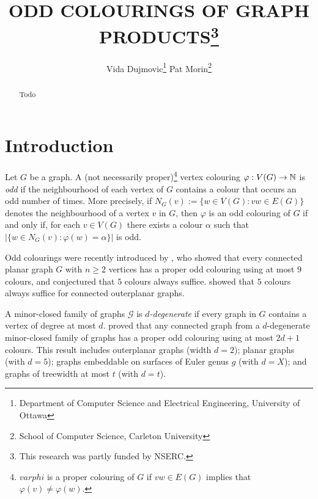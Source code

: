 \documentclass{patmorin}
\title{\MakeUppercase{Odd Colourings of Graph Products}\thanks{This research was partly funded by NSERC.}}
\author{%
  Vida Dujmovic\thanks{Department of Computer Science and Electrical Engineering, University of Ottawa}\qquad
  Pat Morin\thanks{School of Computer Science, Carleton University}
}
\date{}
\begin{document}
\maketitle

\begin{abstract}
  Todo
\end{abstract}

%

\section{Introduction}

Let $G$ be a graph.  A (not necessarily proper)\footnote{$varphi$ is a proper colouring of $G$ if $vw\in E(G)$ implies that $\varphi(v)\neq\varphi(w)$.} vertex colouring $\varphi:V(G)\to\mathbb{N}$ is \emph{odd} if the neighbourhood of each vertex of $G$ contains a colour that occurs an odd number of times.  More precisely, if $N_G(v):=\{w\in V(G):vw\in E(G)\}$ denotes the neighbourhood of a vertex $v$ in $G$, then $\varphi$ is an odd colouring of $G$ if and only if, for each $v\in V(G)$ there exists a colour $\alpha$ such that $|\{w\in N_G(v): \varphi(w)=\alpha\}|$ is odd.

Odd colourings were recently introduced by \citet{petrusevski.skrekovski:colorings}, who showed that every connected planar graph $G$ with $n\ge 2$ vertices has a proper odd colouring using at most $9$ colours, and conjectured that $5$ colours always suffice.  \citet{caro.petrusevski.ea:remarks} showed that $5$ colours always suffice for connected outerplanar graphs.

A minor-closed family of graphs $\mathcal{G}$ is \emph{$d$-degenerate} if every graph in $G$ contains a vertex of degree at most $d$.
\citet{cranston.lafferty.ea:note} proved that any connected graph from a $d$-degenerate minor-closed family of graphs has a proper odd colouring using at most $2d+1$ colours.  This result includes outerplanar graphs (width $d=2$); planar graphs (with $d=5$); graphs embeddable on surfaces of Euler genus $g$ (with $d=X$); and graphs of treewidth at most $t$ (with $d=t$).
\end{document}
